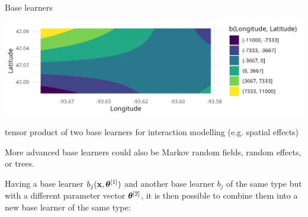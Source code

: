 \documentclass[11pt,compress,t,notes=noshow, xcolor=table]{beamer}
\begin{document}
\begin{vbframe}{Base learners}
\begin{minipage}{0.4\textwidth}
    \includegraphics[width=\linewidth]{figure/compboost-base-learner-tensor.png}
\end{minipage}\hfill
\begin{minipage}{0.5\textwidth}
  tensor product of two base learners for interaction modelling (e.g. spatial effects)
\end{minipage}

\vspace{\baselineskip}

More advanced base learners could also be  Markov random fields, random effects, or trees.

\framebreak

Having a base learner $ b_j(\mathbf{x}, \bm{\theta}^{[1]})$ and another base learner $b_j$ of the same type but with a different parameter vector $\bm{\theta}^{[2]}$, it is then possible to combine them into a new base learner of the same type:


\end{vbframe}
\end{document}
